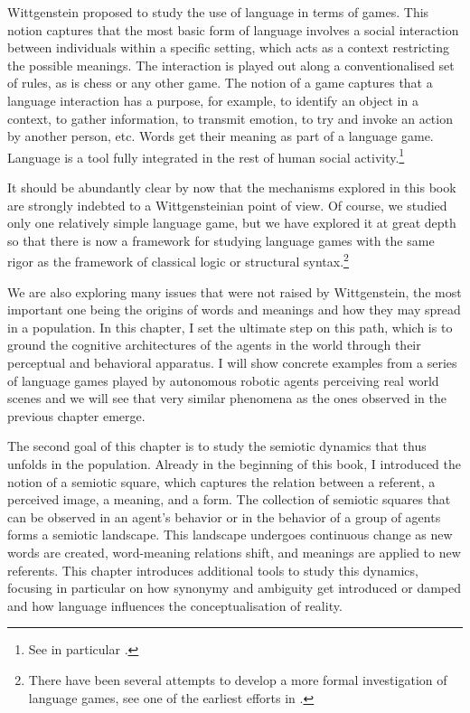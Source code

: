 Wittgenstein proposed to study the use of language in terms of 
games. This notion captures that the most basic form of
language involves a social interaction between individuals
within a specific setting, which acts as a context restricting
the possible meanings. The interaction is played out 
along a conventionalised set of rules, as is chess or any
other game. The notion of a game captures
that a language interaction has a purpose, for example,
to identify an object in a context, to gather 
information, to transmit emotion, to try and
invoke an action by another person, etc. Words get \enlargethispage{1\baselineskip}
their meaning as part of a language game. Language is a tool 
fully integrated in the rest of human social activity.\footnote{See in particular \cite{Wittgenstein:1953}.}

It should be abundantly clear by now that the mechanisms explored
in this book are strongly indebted to a Wittgensteinian 
point of view. Of course, we studied only one relatively 
simple language game, but we have explored it at
great depth so that there is now a framework for
studying language games with the same rigor as 
the framework of classical logic or structural syntax.\footnote{There have been several attempts to develop a 
more formal investigation of language games, see one of the 
earliest efforts in \cite{Hintikka:1998}.}

We are also exploring many issues that were not raised
by Wittgenstein, the most important one being the origins 
of words and meanings and how they may spread in 
a population. In this chapter, I set the ultimate 
step on this path, which is 
to ground the cognitive architectures of the agents
in the world through their perceptual and behavioral
apparatus. I will show concrete examples from a
series of language games played by autonomous 
robotic agents perceiving real world scenes
and we will see that very similar
phenomena as the ones observed in the previous chapter
emerge. 

The second goal of this chapter is to study the semiotic
dynamics that thus unfolds in the population. 
Already in the beginning of this book, I introduced the 
notion of a semiotic square, which captures the relation
between a referent, a perceived image, 
a meaning, and a form. The collection 
of semiotic squares that can be observed in an agent's
behavior or in the behavior of a group of agents
forms a semiotic landscape. This landscape undergoes
continuous change as new words are created, word-meaning relations
shift, and meanings are applied to new referents. 
This chapter introduces additional tools to study this dynamics, 
focusing in particular on how synonymy and ambiguity get
introduced or damped and how language influences the 
conceptualisation of reality. 

